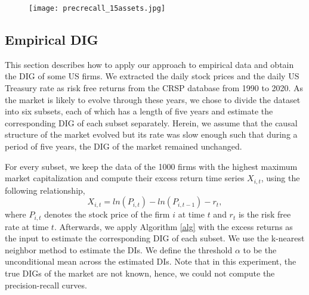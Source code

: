 
\begin{figure}
\centering
\texttt{[image: precrecall\_15assets.jpg]}
\label{fig:perfnonlin}
\end{figure}

\subsection{Empirical DIG}

This section describes how to apply our approach to empirical data and obtain the DIG of some US firms. 
We extracted the daily stock prices and the daily US Treasury rate as risk free returns from the CRSP database from 1990 to 2020. 
As the market is likely to evolve through these years, 
we chose to divide the dataset into six subsets, each of which has a length of five years and estimate the corresponding DIG of each subset separately. 
Herein, we assume that the causal structure of the market evolved but its rate was slow enough such that during a period of five years, the DIG of the market remained unchanged. 

For every subset, we keep the data of the 1000 firms with the highest maximum market capitalization and compute their excess return time series $X_{i,t}$, using the following relationship,
\begin{equation}
X_{i,t} = ln(P_{i,t}) - ln(P_{i,t-1}) - r_t,  
\end{equation}
where $P_{i,t}$ denotes the stock price of the firm $i$ at time $t$ and $r_{t}$ is the risk free rate at time $t$. 
Afterwards, we apply Algorithm \ref{alg} with the excess returns as the input to estimate the corresponding DIG of each subset. 
We use the k-nearest neighbor method to estimate the DIs.
We define the threshold $\alpha$ to be the unconditional mean across the estimated DIs. Note that in this experiment, the true DIGs of the market are not known, hence, we could not compute the precision-recall curves.

